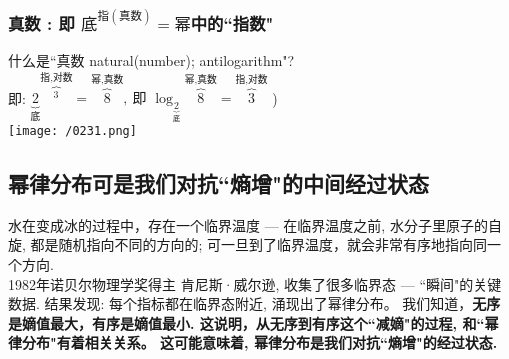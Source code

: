 \documentclass[UTF8]{ctexart}
\begin{document}
	\subsubsection{真数 : 即 $\boxed{\text{底}^{\text{指}(\text{真数})}=\text{幂}}$中的``指数"}
	什么是``真数 natural(number); antilogarithm"? \\
	即: $
	\underset{\text{底}}{\underbrace{2}}\overset{\text{指,对数}}{\overbrace{^3}}=\overset{\text{幂,真数}}{\overbrace{8}},\ \text{即\ }\log _{\underset{\text{底}}{\underbrace{2}}}\overset{\text{幂,真数}}{\overbrace{8}}=\overset{\text{指,对数}}{\overbrace{3}}
	$ ) \\
	
\texttt{[image: /0231.png]} \\




	\subsection{幂律分布可是我们对抗``熵增"的中间经过状态}	
	水在变成冰的过程中，存在一个临界温度 --- 在临界温度之前, 水分子里原子的自旋, 都是随机指向不同的方向的; 可一旦到了临界温度，就会非常有序地指向同一个方向. \\	
	1982年诺贝尔物理学奖得主 肯尼斯·威尔逊, 收集了很多临界态 ---  ``瞬间"的关键数据. 结果发现: 每个指标都在临界态附近, 涌现出了幂律分布。 我们知道，\textbf{无序是嫡值最大，有序是嫡值最小. 这说明，从无序到有序这个``减嫡"的过程, 和``幂律分布"有着相关关系。 这可能意味着, 幂律分布是我们对抗``熵增"的经过状态.} 
	
	
		
	
	
	
\end{document}
